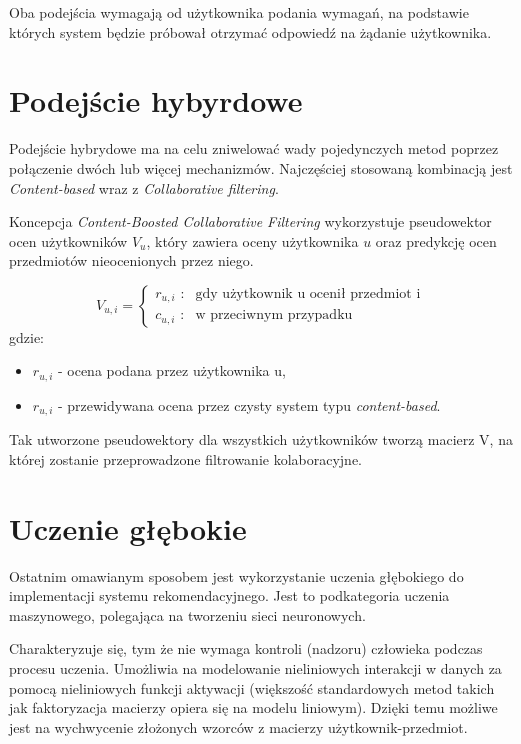 Oba podejścia wymagają od użytkownika podania wymagań, na podstawie których system będzie próbował otrzymać odpowiedź na żądanie użytkownika.

\section{Podejście hybyrdowe}

Podejście hybrydowe ma na celu zniwelować wady pojedynczych metod poprzez połączenie dwóch lub więcej mechanizmów. Najczęściej stosowaną kombinacją jest \textit{Content-based} wraz z \textit{Collaborative filtering}. 

Koncepcja \textit{Content-Boosted Collaborative Filtering} wykorzystuje pseudowektor ocen użytkowników $V_{u}$, który zawiera oceny użytkownika $u$ oraz predykcję ocen przedmiotów nieocenionych przez niego. 

\begin{equation}
V_{u,i} = \left\{ \begin{array}{ll}
\textrm{$r_{u,i}$ :} & \textrm{gdy użytkownik u ocenił przedmiot i}\\
\textrm{$c_{u,i}$ :} & \textrm{w przeciwnym przypadku}
\end{array} \right.
\end{equation} gdzie:
\begin{itemize}
    \item $r_{u,i}$ - ocena podana przez użytkownika u,
    \item $r_{u,i}$ - przewidywana ocena przez czysty system typu \textit{content-based}. 
\end{itemize}
Tak utworzone pseudowektory dla wszystkich użytkowników tworzą macierz V, na której zostanie przeprowadzone filtrowanie kolaboracyjne.


\section{Uczenie głębokie}

Ostatnim omawianym sposobem jest wykorzystanie uczenia głębokiego do implementacji systemu rekomendacyjnego. Jest to podkategoria uczenia maszynowego, polegająca na tworzeniu sieci neuronowych. 

Charakteryzuje się, tym że nie wymaga kontroli (nadzoru) człowieka podczas procesu uczenia. Umożliwia na modelowanie nieliniowych interakcji w danych za pomocą nieliniowych funkcji aktywacji (większość standardowych metod takich jak faktoryzacja macierzy opiera się na modelu liniowym). Dzięki temu możliwe jest na wychwycenie złożonych wzorców z macierzy użytkownik-przedmiot.

